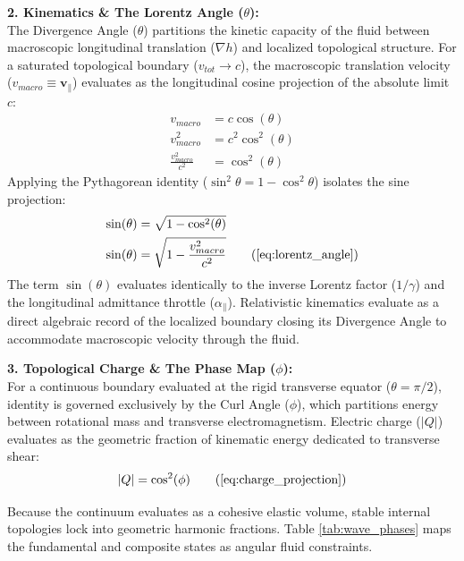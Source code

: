 \documentclass[11pt, a4paper]{article}
\begin{document}
\textbf{2. Kinematics \& The Lorentz Angle ($\theta$):} \\
The Divergence Angle ($\theta$) partitions the kinetic capacity of the fluid between macroscopic longitudinal translation ($\nabla h$) and localized topological structure. For a saturated topological boundary ($v_{tot} \to c$), the macroscopic translation velocity ($v_{macro} \equiv \mathbf{v}_{\parallel}$) evaluates as the longitudinal cosine projection of the absolute limit $c$:
\begin{align}
    v_{macro} &= c \cos(\theta) \nonumber \\
    v_{macro}^2 &= c^2 \cos^2(\theta) \nonumber \\
    \frac{v_{macro}^2}{c^2} &= \cos^2(\theta) 
\end{align}
Applying the Pythagorean identity ($\sin^2\theta = 1 - \cos^2\theta$) isolates the sine projection:
\begin{align}
    \sin(\theta) &= \sqrt{1 - \cos^2(\theta)} \nonumber \\
    \sin(\theta) &= \sqrt{1 - \frac{v_{macro}^2}{c^2}} \tag{\ref{eq:lorentz_angle}}
\end{align}
The term $\sin(\theta)$ evaluates identically to the inverse Lorentz factor ($1/\gamma$) and the longitudinal admittance throttle ($\alpha_{\parallel}$). Relativistic kinematics evaluate as a direct algebraic record of the localized boundary closing its Divergence Angle to accommodate macroscopic velocity through the fluid.

\textbf{3. Topological Charge \& The Phase Map ($\phi$):} \\
For a continuous boundary evaluated at the rigid transverse equator ($\theta = \pi/2$), identity is governed exclusively by the Curl Angle ($\phi$), which partitions energy between rotational mass and transverse electromagnetism. Electric charge ($|Q|$) evaluates as the geometric fraction of kinematic energy dedicated to transverse shear:
\begin{equation}
    |Q| = \cos^2(\phi) \tag{\ref{eq:charge_projection}}
\end{equation}

Because the continuum evaluates as a cohesive elastic volume, stable internal topologies lock into geometric harmonic fractions. Table \ref{tab:wave_phases} maps the fundamental and composite states as angular fluid constraints.
\end{document}
